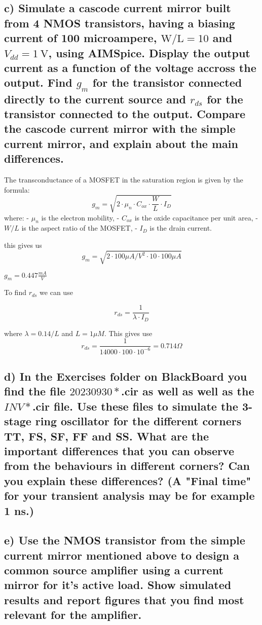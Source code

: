\subsection*{c) Simulate a cascode current mirror built from 4 NMOS transistors, having a biasing current of 100 microampere, $\mathrm{W} / \mathrm{L}=10$ and $V_{d d}=1 \mathrm{~V}$, using AIMSpice. Display the output current as a function of the voltage accross the output. Find $g_m$ for the transistor connected directly to the current source and $r_{d s}$ for the transistor connected to the output. Compare the cascode current mirror with the simple current mirror, and explain about the main differences.}


The transconductance of a MOSFET in the saturation region is given by the formula:
$$
g_m=\sqrt{2 \cdot \mu_n \cdot C_{o x} \cdot \frac{W}{L} \cdot I_D}
$$
where:
- $\mu_n$ is the electron mobility,
- $C_{o x}$ is the oxide capacitance per unit area,
- $W / L$ is the aspect ratio of the MOSFET,
- $I_D$ is the drain current.

this gives us 
$$
g_m=\sqrt{2 \cdot 100\mu A/V^2 \cdot 10 \cdot 100\mu A}
$$

$g_m=0.447\frac{mA}{V}$

To find $r_{ds}$ we can use

$$r_{ds} = \frac{1}{\lambda \cdot I_D}$$

where $\lambda=0.14/L$ and $L=1\mu M$. This gives use
\[r_{ds} =\frac{1}{14000\cdot 100\cdot 10^ {-6}} = 0.714\Omega\]

\subsection*{d) In the Exercises folder on BlackBoard you find the file $20230930 *$.cir as well as well as the $I N V *$.cir file. Use these files to simulate the 3-stage ring oscillator for the different corners TT, FS, SF, FF and SS. What are the important differences that you can observe from the behaviours in different corners? Can you explain these differences? (A "Final time" for your transient analysis may be for example 1 ns.)}



\subsection*{e) Use the NMOS transistor from the simple current mirror mentioned above to design a common source amplifier using a current mirror for it’s active load. Show simulated results and report figures that you find most relevant for the amplifier.}

